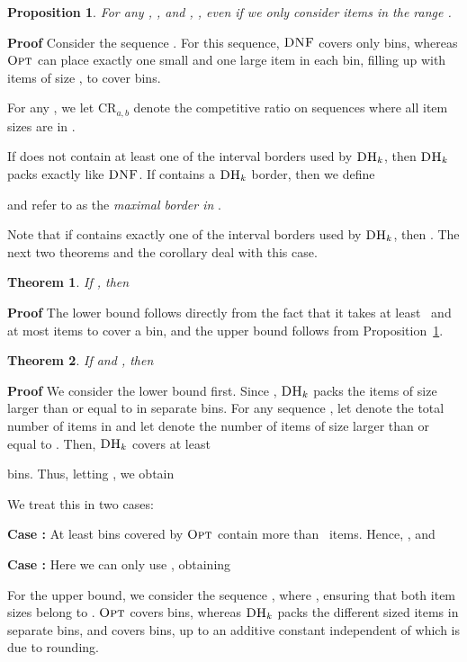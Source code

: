 \documentclass[11pt]{article}
\newtheorem{xtheorem}{Theorem}
\newtheorem{xproposition}{Proposition}
\newenvironment{theorem}{\begin{xtheorem}\rm}{\end{xtheorem}}
\newenvironment{proposition}{\begin{xproposition}\rm}{\end{xproposition}}
\newenvironment{proof}{\begin{trivlist}\item[]{\bf Proof }}{\hspace*{\fill}\raisebox{-1pt}{\boldmath}\end{trivlist}}
\newcommand{\OPT}{\ensuremath{\operatorname{\textsc{Opt}}}\xspace}
\newcommand{\DNF}{\ensuremath{\operatorname{\textsc{DNF}}}\xspace}
\newcommand{\DHk}{{\ensuremath{\textsc{DH}_k}}\xspace}
\newcommand{\CRabu}{\ensuremath{\mathrm{CR}_{a,b}}\xspace}
\begin{document}
\begin{proposition}
\label{proposition-basic-dnf}
For any , , and ,
, even if we
only consider items in the range
.
\end{proposition}
\begin{proof}
Consider the sequence 
.
For this sequence, \DNF covers only  bins, whereas \OPT can
place exactly one small and one large item in each bin, filling up with
items of size , to cover  bins.
\end{proof}

For any , we let
\CRabu denote the competitive ratio on
sequences where all item sizes are in .

If  does not contain at least one of the interval borders
used by \DHk, then \DHk packs exactly like \DNF.
If  contains a \DHk border, then we define 
 
and refer to  as the {\em maximal border in }.

Note that if  contains exactly one of the interval borders
used by \DHk, then .
The next two theorems and the corollary deal with this case.

\begin{theorem}\label{lemma-DNF-2int}
If , then 

\end{theorem}
\begin{proof}
The lower bound follows directly from the fact that it takes at 
least~ and at most  items to cover a bin,
and the upper bound follows from Proposition~\ref{proposition-basic-dnf}.
\end{proof}

\begin{theorem}\label{lemma-Har-2int}
If  and , then 

\end{theorem}
\begin{proof}
We consider the lower bound first.
Since , \DHk packs the items of size larger than or equal
 to  in separate bins.
For any sequence , let  denote the total number of items in  and
let  denote the number of items of size larger than or equal to
.
Then, \DHk covers at least

bins. 
Thus, letting , we obtain 


We treat this in two cases:

\textbf{Case :} At least  bins covered by \OPT contain more than ~items.
Hence, ,
and


\textbf{Case :}
Here we can only use , obtaining


For the upper bound,
we consider the sequence ,
where ,
ensuring that both item sizes belong to .
\OPT covers  bins, whereas
\DHk packs the different sized items in separate bins,
and covers  bins,
up to an additive constant independent of  which is due to rounding.
\end{proof}
\end{document}

